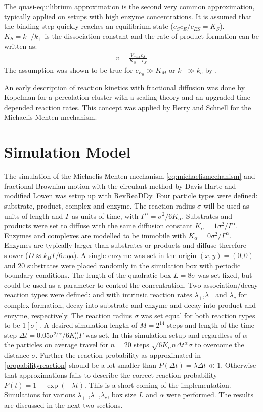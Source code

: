 \documentclass[
  a4paper,BCOR10mm,twoside,
  headsepline,footsepline,%
  fleqn,openbib
]{scrbook}
\begin{document}
The quasi-equilibrium approximation is the second very common approximation, typically applied on setups with high enzyme concentrations. It is assumed that the binding step quickly reaches an equilibrium state ($c_S c_E/c_{ES}=K_S$). $K_S=k_-/k_+$ is the dissociation constant and the rate of product formation can be written as:
\begin{align}
 v={\frac{V_{max} c_S}{K_S+ c_S}}
\end{align}
The assumption was shown to be true for $c_{E_0}\gg K_M \text{ or } k_- \gg k_c$ by \citet{Palsson1987}.\par  An early description of reaction kinetics with fractional diffusion was done by Kopelman \cite{Kopelman1988} for a percolation cluster with a scaling theory and an upgraded time depended reaction rates. This concept was applied by Berry \cite{Berry2002} and Schnell \cite{Schnell2004} for the Michaelis-Menten mechanism.
\section{Simulation Model}
The simulation of the Michaelis-Menten mechanism \cref{eq:michaelismechanism} and fractional Brownian motion with the circulant method by Davis-Harte \cite{Dieker2004} and modified Lowen was setup up with RevReaDDy. Four particle types were defined: substrate, product, complex and enzyme. The reaction radius $\sigma$ will be used as units of length and  $\Gamma$ as units of time, with $\Gamma^{\alpha}=\sigma^2/6 K_{\alpha} $.   Substrates and products were set to diffuse with the same diffusion constant $K_{\alpha}=1 \sigma^2 / \Gamma^{\alpha} $. Enzymes and complexes are modelled to be immobile with $K_{\alpha}= 0 \sigma^2 / \Gamma^{\alpha} $. Enzymes are typically larger than substrates or products and diffuse therefore slower ($D\approx k_B T/6 \pi \eta a$).  A single enzyme was set in the origin $(x,y)=(0,0)$ and 20 substrates were placed randomly in the simulation box with periodic boundary conditions. The length of the quadratic box $L=8 \sigma$ was set fixed, but could be used as a parameter to control the concentration. Two association/decay reaction types were defined:   and  with intrinsic reaction rates $\lambda_+$,$\lambda_-$ and $\lambda_c$ for complex formation, decay into substrate and enzyme and decay into product and enzyme, respectively. The reaction radius $\sigma$ was set equal for both reaction types to be $1 [\sigma]$. A desired simulation length of $M=2^{14}$ steps and length of the time step $\Delta t=0.05 \sigma^{2/\alpha}/6 K_{\alpha}^{\alpha} \Gamma $ was set. In this simulation setup and regardless of $\alpha$ the particles on average travel for $n=20$ steps $\sqrt{6K_{\alpha} n \Delta t^{\alpha}} \sigma$ to overcome the distance $\sigma$. Further the reaction probability  as approximated in \cref{propabilityreaction} should be a lot smaller than  $P(\Delta t)=\lambda \Delta t \ll 1$. Otherwise that approximations fails to describe the correct reaction probability $P(t)=1-\exp(-\lambda t)$. This is a short-coming of the implementation. Simulations for various $\lambda_+$ ,$\lambda_-$,$\lambda_c$, box size $L$ and $\alpha$ were performed. The results are discussed in the next two sections. 
\end{document}
